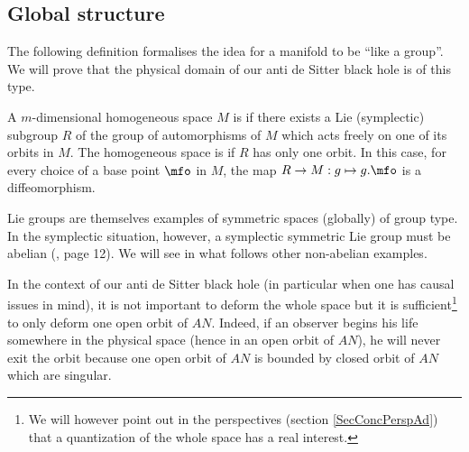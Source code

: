  \subsection{Global structure}

The following definition formalises the idea for a manifold to be ``like a group''. We will prove that the physical domain of our anti de Sitter black hole is of this type.
\begin{definition}
A $m$-dimensional homogeneous space $M$ is  if there exists a Lie (symplectic) subgroup $R$ of the group of automorphisms of $M$ which acts freely on one of its orbits in $M$. The homogeneous space is  if $R$ has only one orbit. In this case, for every choice of a base point $\mfo$ in $M$, the map $R\to M:g\mapsto g.\mfo$ is a diffeomorphism.
			\label{DefGlobGpType}
\end{definition}

Lie groups are themselves examples of symmetric spaces (globally) of group type.  In the symplectic situation, however, a symplectic symmetric Lie group must be abelian (\cite{ThzPierre}, page 12). We will see in what follows other non-abelian examples.  

In the context of our anti de Sitter black hole (in particular when one has causal issues in mind), it is not important to deform the whole space but it is sufficient\footnote{We will however point out in the perspectives (section \ref{SecConcPerspAd}) that a quantization of the whole space has a real interest.} to only deform one open orbit of $AN$. Indeed, if an observer begins his life somewhere in the physical space (hence in an open orbit of $AN$), he will never exit the orbit because one open orbit of $AN$ is bounded by closed orbit of $AN$ which are singular.

